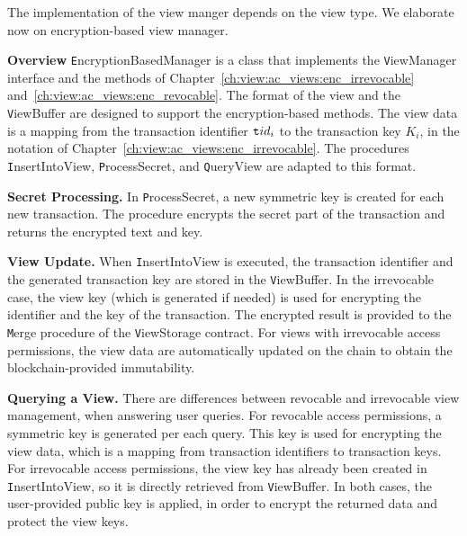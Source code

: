 The implementation of the view manger depends on the view type.
We elaborate now on encryption-based view manager.

\medskip
\noindent
\textbf{Overview} 
{\texttt EncryptionBasedManager} is a class that implements the {\texttt ViewManager} interface and the methods of Chapter~\ref{ch:view:ac_views:enc_irrevocable} and~\ref{ch:view:ac_views:enc_revocable}. 
The format of the view and the {\texttt ViewBuffer} are designed to support the encryption-based methods. 
The view data is a mapping from the transaction identifier ${\texttt tid\/}_i$ to the transaction key $K_i$, in the notation of Chapter~\ref{ch:view:ac_views:enc_irrevocable}. The procedures  {\texttt InsertIntoView}, {\texttt ProcessSecret}, and {\texttt QueryView} are adapted to this format.

\medskip
\noindent
\textbf{Secret Processing.}
In {\texttt ProcessSecret}, a new symmetric key is created for each new transaction.
The procedure encrypts the secret part of the transaction and returns the encrypted text and key. 

\medskip
\noindent
\textbf{View Update.}
When {\texttt InsertIntoView} is executed, 
the transaction identifier and the generated transaction key are stored in the {\texttt ViewBuffer}.
In the irrevocable case, 
the view key (which is generated if needed) is used for encrypting the identifier and the key of the transaction. 
The encrypted result is provided to the {\texttt Merge} procedure of the {\texttt ViewStorage} contract.
For views with irrevocable access permissions, the view data are automatically updated on the chain to obtain the blockchain-provided immutability. 

\medskip
\noindent
\textbf{Querying a View.}
There are differences between revocable and irrevocable view management, when answering user queries. 
For revocable access permissions, a symmetric key is generated per each query.
This key is used for encrypting the view data, which is a mapping from transaction identifiers to transaction keys.
For irrevocable access permissions, the view key has already been created in {\texttt InsertIntoView}, so it is directly retrieved from {\texttt ViewBuffer}. 
In both cases, the user-provided public key is applied, in order to encrypt the returned data and protect the view keys. 

